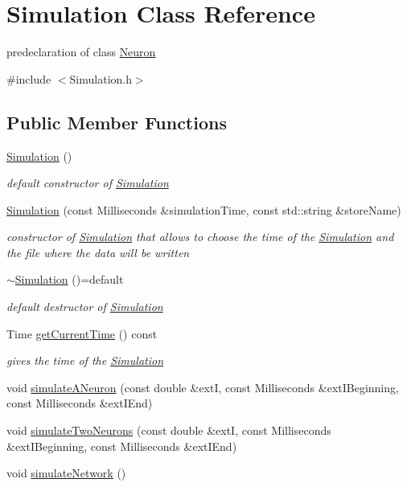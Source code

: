 \hypertarget{classSimulation}{}\section{Simulation Class Reference}
\label{classSimulation}


predeclaration of class \hyperlink{classNeuron}{Neuron}  




{\ttfamily \#include $<$Simulation.\+h$>$}

\subsection*{Public Member Functions}
\begin{DoxyCompactItemize}
\item 
\hyperlink{classSimulation_a5b224cc5b36bcc8eb29689aff223de41}{Simulation} ()
\begin{DoxyCompactList}\small\item\em default constructor of \hyperlink{classSimulation}{Simulation} \end{DoxyCompactList}\item 
\hyperlink{classSimulation_ae450f79abac7a43794aa946c2c708a79}{Simulation} (const Milliseconds \&simulation\+Time, const std\+::string \&store\+Name)
\begin{DoxyCompactList}\small\item\em constructor of \hyperlink{classSimulation}{Simulation} that allows to choose the time of the \hyperlink{classSimulation}{Simulation} and the file where the data will be written \end{DoxyCompactList}\item 
\hyperlink{classSimulation_aabcfa929f9e6622346ece569f0229a91}{$\sim$\+Simulation} ()=default\hypertarget{classSimulation_aabcfa929f9e6622346ece569f0229a91}{}\label{classSimulation_aabcfa929f9e6622346ece569f0229a91}

\begin{DoxyCompactList}\small\item\em default destructor of \hyperlink{classSimulation}{Simulation} \end{DoxyCompactList}\item 
Time \hyperlink{classSimulation_a95bb6273bcc774ad750242db5bc5a58b}{get\+Current\+Time} () const 
\begin{DoxyCompactList}\small\item\em gives the time of the \hyperlink{classSimulation}{Simulation} \end{DoxyCompactList}\item 
void \hyperlink{classSimulation_a87d231aa29cd6fa002db42255809eebc}{simulate\+A\+Neuron} (const double \&extI, const Milliseconds \&ext\+I\+Beginning, const Milliseconds \&ext\+I\+End)
\item 
void \hyperlink{classSimulation_a4f14cd93475b42b2c7820429c11310ec}{simulate\+Two\+Neurons} (const double \&extI, const Milliseconds \&ext\+I\+Beginning, const Milliseconds \&ext\+I\+End)
\item 
void \hyperlink{classSimulation_adac9da47097e52547c8fada8a1d9ba46}{simulate\+Network} ()
\end{DoxyCompactItemize}


